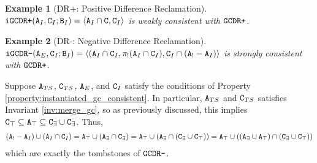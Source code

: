 \documentclass{article}
\numberwithin{equation}{section}
\newtheorem{example}{Example}[section]
\renewcommand{\tt}[1]{\ifmmode\text{\texttt{#1}}\else\texttt{#1}\fi}
\begin{document}
\begin{example}[DR+: Positive Difference Reclamation]
$\tt{iGCDR+}(\tt{A}_I, \tt{C}_I; \tt{B}_I) = \langle \tt{A}_I \cap \tt{C}, \tt{C}_I\rangle$ is weakly consistent with $\tt{GCDR+}$.
\end{example}

\begin{example}[DR-: Negative Difference Reclamation]
$\tt{iGCDR-}(\tt{A}_E, \tt{C}_I; \tt{B}_I) = \langle (\tt{A}_I \cap \tt{C}_I, \pi_!(\tt{A}_I \cap \tt{C}_I), \tt{C}_I \cap (\tt{A}_! - \tt{A}_I)\rangle$ is strongly consistent with $\tt{GCDR+}$.
\end{example}
Suppose $\tt{A}_{TS}$, $\tt{C}_{TS}$, $\tt{A}_E$, and $\tt{C}_I$ satisfy the conditions of Property \ref{property:instantiated_gc_consistent}.
In particular, $\tt{A}_{TS}$ and $\tt{C}_{TS}$ satisfies Invariant \ref{inv:merge_gc}, so as previously discussed, this implies $\tt{C}_\top \subseteq \tt{A}_\top \subseteq \tt{C}_\exists \cup \tt{C}_\exists$.
Thus,
\begin{align*}
(\tt{A}_! - \tt{A}_I) \cup (\tt{A}_I \cap \tt{C}_I)
= \tt{A}_\top \cup (\tt{A}_\exists \cap \tt{C}_\exists)
= \tt{A}_\top \cup (\tt{A}_\exists \cap (\tt{C}_\exists \cup \tt{C}_\top))
= \tt{A}_\top \cup ((\tt{A}_\exists \cup \tt{A}_\top) \cap (\tt{C}_\exists \cup \tt{C}_\top))
\end{align*}
which are exactly the tombstones of $\tt{GCDR-}$.
\end{document}
